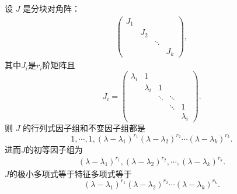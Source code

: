 \documentclass[../../main.tex]{subfiles}
\begin{document}
\begin{lemma}\label{lemma:Jordan矩阵的初等因子组}
设 $J$ 是分块对角阵：
\begin{align*}
\begin{pmatrix}
J_1 & & & \\
& J_2 & & \\
& & \ddots & \\
& & & J_k
\end{pmatrix},
\end{align*}
其中$J_i$是$r_i$阶矩阵且
\[
J_i = \begin{pmatrix}
\lambda_i & 1 & & & \\
& \lambda_i & 1 & & \\
& & \ddots & \ddots & \\
& & & \ddots & 1 \\
& & & & \lambda_i
\end{pmatrix}.
\]
则 $J$ 的行列式因子组和不变因子组都是
\[
1,\cdots,1,(\lambda - \lambda_1)^{r_1}(\lambda - \lambda_2)^{r_2}\cdots(\lambda - \lambda_k)^{r_k}.
\]
进而$J$的初等因子组为
\begin{align*}
(\lambda - \lambda_1)^{r_1}, (\lambda - \lambda_2)^{r_2}, \cdots, (\lambda - \lambda_k)^{r_k}.
\end{align*}
$J$的极小多项式等于特征多项式等于
$$
(\lambda - \lambda_1)^{r_1}(\lambda - \lambda_2)^{r_2}\cdots(\lambda - \lambda_k)^{r_k}.
$$
\end{lemma}
\end{document}
